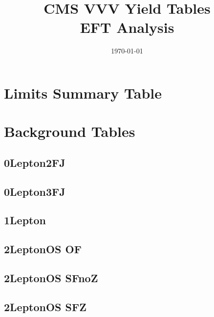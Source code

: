 \documentclass[landscape, 12pt,letterpaper]{article}
\title{CMS VVV Yield Tables\\EFT Analysis}
\author{}
\date{\today}
\begin{document}
\maketitle
\thispagestyle{empty}

\newpage

\section{Limits Summary Table}


\newpage

\section{Background Tables}
\subsection{0Lepton2FJ }


\newpage

\subsection{0Lepton3FJ }


\newpage

\subsection{1Lepton }


\newpage

\subsection{2LeptonOS OF}


\newpage

\subsection{2LeptonOS SFnoZ}


\newpage

\subsection{2LeptonOS SFZ}


\newpage
\end{document}
